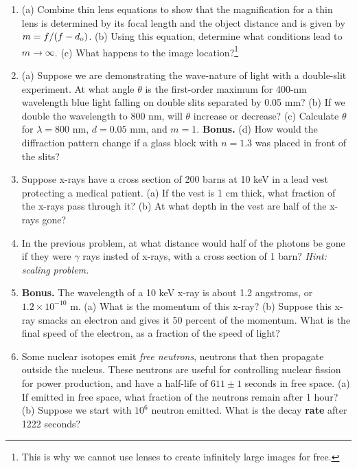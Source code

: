 \documentclass[12pt,twocolumn]{article}
\begin{document}
\begin{enumerate}
\item (a) Combine thin lens equations to show that the magnification for a thin lens is determined by its focal length and the object distance and is given by $m=f/(f - d_{\rm o})$. (b) Using this equation, determine what conditions lead to $m \to \infty$. (c) What happens to the image location?\footnote{This is why we cannot use lenses to create infinitely large images for free.} \\ \vspace{3cm}
\item (a) Suppose we are demonstrating the wave-nature of light with a double-slit experiment.  At what angle $\theta$ is the first-order maximum for 400-nm wavelength blue light falling on double slits separated by 0.05 mm? (b) If we double the wavelength to 800 nm, will $\theta$ increase or decrease? (c) Calculate $\theta$ for $\lambda = 800$ nm, $d = 0.05$ mm, and $m = 1$.  \textbf{Bonus.} (d) How would the diffraction pattern change if a glass block with $n = 1.3$ was placed in front of the slits? \\ \vspace{2.5cm}
\item Suppose x-rays have a cross section of 200 barns at 10 keV in a lead vest protecting a medical patient. (a) If the vest is 1 cm thick, what fraction of the x-rays pass through it? (b) At what depth in the vest are half of the x-rays gone? \\ \vspace{2cm}
\item In the previous problem, at what distance would half of the photons be gone if they were $\gamma$ rays insted of x-rays, with a cross section of 1 barn?  \textit{Hint: scaling problem.} \\ \vspace{2cm}
\item \textbf{Bonus.}  The wavelength of a 10 keV x-ray is about 1.2 angstroms, or $1.2 \times 10^{-10}$ m.  (a) What is the momentum of this x-ray? (b) Suppose this x-ray smacks an electron and gives it 50 percent of the momentum.  What is the final speed of the electron, as a fraction of the speed of light? \\ \vspace{2cm}
\item Some nuclear isotopes emit \textit{free neutrons}, neutrons that then propagate outside the nucleus.  These neutrons are useful for controlling nuclear fission for power production, and have a half-life of $611\pm 1$ seconds in free space.  (a) If emitted in free space, what fraction of the neutrons remain after 1 hour? (b) Suppose we start with $10^6$ neutron emitted.  What is the decay \textbf{rate} after 1222 seconds? \\ \vspace{3cm}

\end{enumerate}
\end{document}
